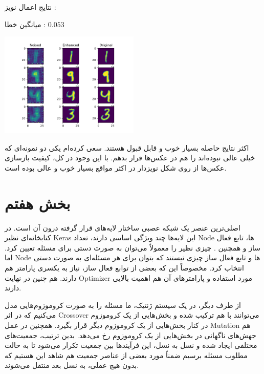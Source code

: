 \documentclass[12pt,titlepage,a4page , tikz , multi,table , svgnames,xcdraw]{article}
\begin{document}
\hrulefill


\newpage

نتایج اعمال نویز :

میانگین خطا : $0.053$

\begin{center}

 \includegraphics[width=0.5\textwidth]{pictures/30.png}

\end{center}


\hrulefill


اکثر نتایج حاصله بسیار خوب و قابل قبول هستند. سعی کرده‌ام یکی دو نمونه‌ای که خیلی عالی نبوده‌اند را هم در عکس‌ها قرار بدهم. با این وجود در کل، کیفیت بازسازی عکس‌ها از روی شکل نویزدار در اکثر مواقع بسیار خوب و عالی بوده است.

\newpage

\section{بخش هفتم}

اصلی‌ترین عنصر یک شبکه عصبی ساختار لایه‌های قرار گرفته درون آن است. در کتابخانه‌ای نظیر Keras این لایه‌ها چند ویژگی اساسی دارند، تعداد Node ها، تابع فعال ساز و همچنین . چیزی نظیر  را معمولاً می‌توان به صورت دستی برای مسئله تعیین کرد. اما Node ها و تابع فعال ساز چیزی نیستند که بتوان برای هر مسئله‌ای به صورت دستی انتخاب کرد. مخصوصاً این که بعضی از توابع فعال ساز، نیاز به یکسری پارامتر هم دارند. هم چنین در نهایت Optimizer مورد استفاده و پارامترهای آن هم اهمیت بالایی دارند.

از طرف دیگر، در یک سیستم ژنتیک، ما مسئله را به صورت کروموزوم‌هایی مدل می‌کنیم که در اثر Crossover می‌توانند با هم ترکیب شده و بخش‌هایی از یک کروموزوم در کنار بخش‌هایی از یک کروموزوم دیگر قرار بگیرد. همچنین در عمل Mutation هم جهش‌های ناگهانی در بخش‌هایی از یک کروموزوم رخ می‌دهد. بدین ترتیب، جمعیت‌های مختلفی ایجاد شده و نسل به نسل، این فرآیندها بین جمعیت تکرار می‌شود تا به حالت مطلوب مسئله برسیم ضمناً مورد بعضی از عناصر جمعیت هم شاهد این هستیم که بدون هیچ عملی، به نسل بعد منتقل می‌شوند.
\end{document}
